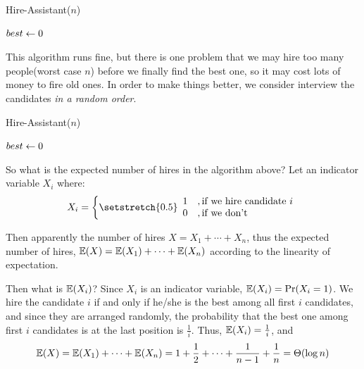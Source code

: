 \documentclass[11pt, a4paper]{COMP3711}
\begin{document}
\begin{spacing}{1.5}
    \begin{algorithm*}
        \caption{Hire-Assistant($n$)}

        $best\leftarrow 0$

    \end{algorithm*}

    This algorithm runs fine, but there is one problem that we 
    may hire too many people(worst case $n$) 
    before we finally find the best one,
    so it may cost lots of money to fire old ones.
    In order to make things better, we consider interview the 
    candidates {\it in a random order}.

    \begin{algorithm*}
        \caption{Hire-Assistant($n$)}

        {}

        $best\leftarrow 0$

    \end{algorithm*}

    So what is the expected number of hires in the algorithm above?
    Let an indicator variable $X_i$ where: 
    $$X_i=\left\{ 
        \setstretch{0.5}
        \begin{array}{ll}
            1 &, \text{if we hire candidate }i\\
            0 &, \text{if we don't}
        \end{array}
     \right.$$
    
    Then apparently the number of hires $X=X_1+\cdots+X_n$, thus 
    the expected number of hires, $\mathbb{E}(X)=\mathbb{E}(X_1)+\cdots+\mathbb{E}(X_n)$ 
    according to the linearity of expectation.

    Then what is $\mathbb{E}(X_i)$? Since $X_i$ is an indicator variable, 
    $\mathbb{E}(X_i)=\Pr(X_i=1)$. We hire the candidate $i$ if and only 
    if he/she is the best among all first $i$ candidates, and 
    since they are arranged randomly, the probability that the best 
    one among first $i$ candidates is at the last position is $\frac{1}{i}$.
    Thus, $\mathbb{E}(X_i)=\frac{1}{i}$, and 
    $$\mathbb{E}(X)=\mathbb{E}(X_1)+\cdots+\mathbb{E}(X_n)=1+\frac{1}{2}+\cdots+\frac{1}{n-1}+\frac{1}{n}
    =\Theta(\log n)$$


\end{spacing}
\end{document}
